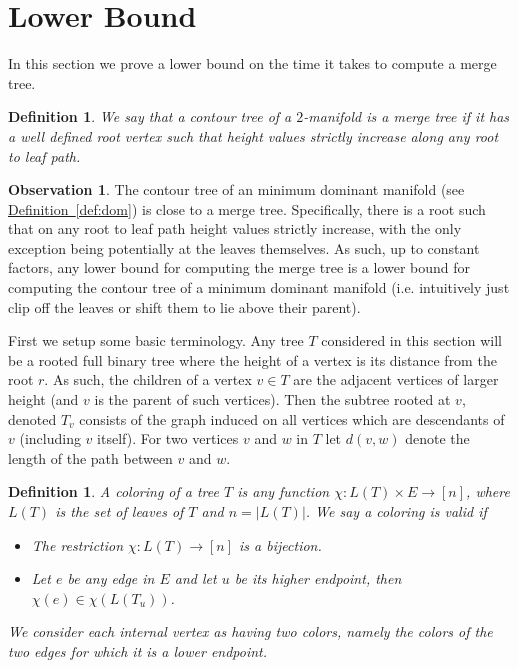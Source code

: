 \documentclass[11pt]{article}
\newtheorem{definition}[theorem]{Definition}
\theoremstyle{definition}
\newtheorem{observation}{Observation}
\newcommand{\Def}[1]{\hyperref[def:#1]{Definition~\ref*{def:#1}}} %
\begin{document}
\pagebreak
\section{Lower Bound}

In this section we prove a lower bound on the time it takes to compute a merge tree.

\begin{definition}
 We say that a contour tree of a $2$-manifold is a \emph{merge tree} if it has a well defined root vertex such that height values 
 strictly increase along any root to leaf path.
\end{definition}

\begin{observation}
 The contour tree of an minimum dominant manifold (see \Def{dom}) is close to a merge tree.  Specifically, there is a root such that on any root 
 to leaf path height values strictly increase, with the only exception being potentially at the leaves themselves.  As such, up to constant 
 factors, any lower bound for computing the merge tree is a lower bound for computing the contour tree of a minimum dominant
 manifold (i.e. intuitively just clip off the leaves or shift them to lie above their parent).
\end{observation}




First we setup some basic terminology.
Any tree $T$ considered in this section will be a rooted full binary tree where the height of a vertex is its distance 
from the root $r$.  As such, the children of a vertex $v\in T$ are the adjacent vertices of larger height
(and $v$ is the parent of such vertices).  Then the subtree rooted at $v$, denoted $T_v$ consists of the graph induced on all 
vertices which are descendants of $v$ (including $v$ itself).  For two vertices $v$ and $w$ in $T$ let $d(v,w)$ denote the 
length of the path between $v$ and $w$.

\begin{definition}
 A coloring of a tree $T$ is any function $\chi:L(T)\times E \rightarrow [n]$, where $L(T)$ is the set of leaves of $T$ and $n = |L(T)|$.  
 We say a coloring is valid if
 \begin{itemize}
  \item The restriction $\chi:L(T) \rightarrow [n]$ is a bijection.
  \item Let $e$ be any edge in $E$ and let $u$ be its higher endpoint, then $\chi(e) \in \chi(L(T_u))$. 
 \end{itemize}
 We consider each internal vertex as having two colors, namely the colors of the two edges for which it is a lower endpoint.
\end{definition}
\end{document}
